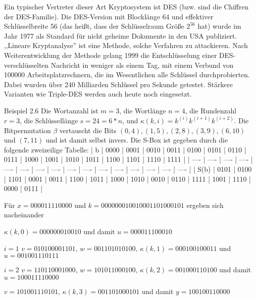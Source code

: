 \documentclass[a4paper]{article}
\begin{document}
\begin{multicols}{3}
    Ein typischer Vertreter dieser Art Kryptosystem ist DES (bzw. sind die Chiffren der DES-Familie). Die DES-Version mit Blocklänge 64 und effektiver Schlüsselbreite 56 (das heißt, dass der Schlüsselraum Größe $2^{56}$ hat) wurde im Jahr 1977 als Standard für nicht geheime Dokumente in den USA publiziert. ,,Lineare Kryptanalyse'' ist eine Methode, solche Verfahren zu attackieren. Nach Weiterentwicklung der Methode gelang 1999 die Entschlüsselung einer DES-verschlüsselten Nachricht in weniger als einem Tag, mit einem Verbund von 100000 Arbeitsplatzrechnern, die im Wesentlichen alle Schlüssel durchprobierten. Dabei wurden über 240 Milliarden Schlüssel pro Sekunde getestet. Stärkere Varianten wie Triple-DES werden auch heute noch eingesetzt.

    Beispiel 2.6 Die Wortanzahl ist $m=3$, die Wortlänge $n=4$, die Rundenzahl $r=3$, die Schlüssellänge $s=24=6*n$, und $\kappa (k,i)=k^{(i)}k^{(i+1)}k^{(i+2)}$. Die Bitpermutation $\beta$ vertauscht die Bits $(0,4),(1,5),(2,8),(3,9),(6,10)$ und $(7,11)$ und ist damit selbst invers. Die S-Box ist gegeben durch die folgende zweizeilige Tabelle:
    | b    | 0000 | 0001 | 0010 | 0011 | 0100 | 0101 | 0110 | 0111 | 1000 | 1001 | 1010 | 1011 | 1100 | 1101 | 1110 | 1111 |
    | ---- | ---- | ---- | ---- | ---- | ---- | ---- | ---- | ---- | ---- | ---- | ---- | ---- | ---- | ---- | ---- |
    | S(b) | 0101 | 0100 | 1101 | 0001 | 0011 | 1100 | 1011 | 1000 | 1010 | 0010 | 0110 | 1111 | 1001 | 1110 | 0000 | 0111 |

    Für $x= 0000 1111 0000$ und $k=0000 0001 0010 0011 0100 0101$ ergeben sich nacheinander
    \begin{enumerate*}
        \item $\kappa (k,0) = 0000 0001 0010$ und damit $u= 0000 1110 0010$
        \item
        \begin{itemize*}
            \item $i=1$ $v=0101 0000 1101$, $w=0011 0101 0100$, $\kappa (k,1) = 0001 0010 0011$ und $u=0010 0111 0111$
            \item $i=2$ $v=1101 1000 1000$, $w=1010 1100 0100$, $\kappa (k,2) = 0010 0011 0100$ und damit $u= 1000 1111 0000$
        \end{itemize*}
        \item  $v=1010 0111 0101$, $\kappa (k,3) = 0011 0100 0101$ und damit $y=1001 0011 0000$
    \end{enumerate*}



\end{multicols}
\end{document}
